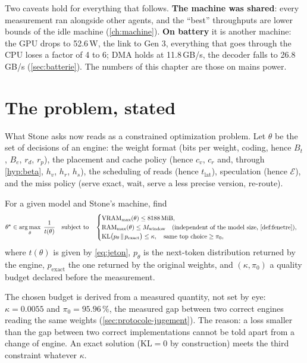 Two caveats hold for everything that follows. \textbf{The machine was shared}: every measurement ran alongside other agents, and the ``best'' throughputs are lower bounds of the idle machine (\cref{ch:machine}). \textbf{On battery} it is another machine: the GPU drops to 52.6\,W, the link to Gen 3, everything that goes through the CPU loses a factor of 4 to 6; DMA holds at 11.8\,GB/s, the decoder falls to 26.8\,GB/s (\cref{sec:batterie}). The numbers of this chapter are those on mains power.

\section{The problem, stated}\label{sec:probleme}

What Stone asks now reads as a constrained optimization problem. Let $\theta$ be the set of decisions of an engine: the weight format (bits per weight, coding, hence $B_t$, $B_e$, $r_d$, $r_p$), the placement and cache policy (hence $c_v$, $c_r$ and, through \cref{hyp:beta}, $h_v$, $h_r$, $h_s$), the scheduling of reads (hence $t_{\mathrm{lat}}$), speculation (hence $\mathcal E$), and the miss policy (serve exact, wait, serve a less precise version, re-route).

\begin{definition}\label{def:probleme}
For a given model and Stone's machine, find
\begin{equation}\label{eq:probleme}
\theta^\star \in \argmax_{\theta}\; \frac{1}{t(\theta)}
\quad\text{subject to}\quad
\begin{cases}
\mathrm{VRAM}_{\max}(\theta) \le \SI{8188}{\mebi\byte}, \\
\mathrm{RAM}_{\max}(\theta) \le M_{\text{window}} \quad \text{(independent of the model size, \cref{def:fenetre})}, \\
\mathrm{KL}\bigl(p_\theta \,\|\, p_{\text{exact}}\bigr) \le \kappa, \quad \text{same top choice} \ge \pi_0 ,
\end{cases}
\end{equation}
where $t(\theta)$ is given by \cref{eq:jeton}, $p_\theta$ is the next-token distribution returned by the engine, $p_{\text{exact}}$ the one returned by the original weights, and $(\kappa, \pi_0)$ a quality budget declared before the measurement.
\end{definition}

The chosen budget is derived from a measured quantity, not set by eye: $\kappa = 0.0055$ and $\pi_0 = 95.96\,\%$, the measured gap between two correct engines reading the same weights (\cref{sec:protocole-jugement}). The reason: a loss smaller than the gap between two correct implementations cannot be told apart from a change of engine. An exact solution ($\mathrm{KL} = 0$ by construction) meets the third constraint whatever $\kappa$.

